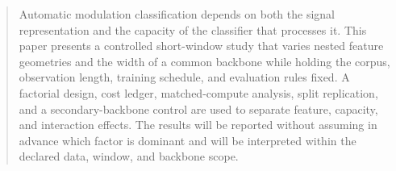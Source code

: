\begin{abstract}
Automatic modulation classification depends on both the signal representation
and the capacity of the classifier that processes it. This paper presents a
controlled short-window study that varies nested feature geometries and the
width of a common backbone while holding the corpus, observation length,
training schedule, and evaluation rules fixed. A factorial design, cost ledger,
matched-compute analysis, split replication, and a secondary-backbone control
are used to separate feature, capacity, and interaction effects. The results
will be reported without assuming in advance which factor is dominant and will
be interpreted within the declared data, window, and backbone scope.
\end{abstract}
